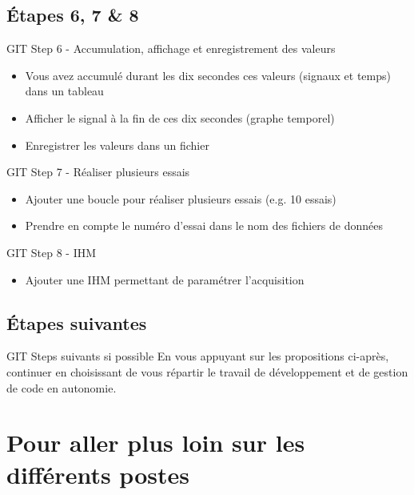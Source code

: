 \documentclass[a4paper,11pt]{beamer}
\begin{document}
\subsection{Étapes 6, 7 \& 8}
\begin{frame}
\begin{exampleblock}{GIT Step 6 - Accumulation, affichage et enregistrement des valeurs}
\begin{itemize}
\item Vous avez accumulé durant les dix secondes ces valeurs (signaux et temps) dans un tableau
\item Afficher le signal à la fin de ces dix secondes (graphe temporel)
\item Enregistrer les valeurs dans un fichier
\end{itemize}
\end{exampleblock}
\begin{exampleblock}{GIT Step 7 - Réaliser plusieurs essais}
\begin{itemize}
\item Ajouter une boucle pour réaliser plusieurs essais (e.g. 10 essais)
\item Prendre en compte le numéro d'essai dans le nom des fichiers de données
\end{itemize}
\end{exampleblock}
\begin{exampleblock}{GIT Step 8 - IHM}
\begin{itemize}
\item Ajouter une IHM permettant de paramétrer l'acquisition
\end{itemize}
\end{exampleblock}
\end{frame}

\subsection{Étapes suivantes}
\begin{frame}
\begin{exampleblock}{GIT Steps suivants si possible}
\justifying
En vous appuyant sur les propositions ci-après, continuer en choisissant de vous répartir le travail de développement et de gestion de code en autonomie.
\end{exampleblock}
\end{frame}


\section{Pour aller plus loin sur les différents postes}
\end{document}
